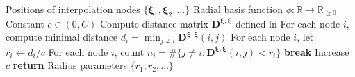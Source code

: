 \begin{algorithmic}[1]
    \Require Positions of interpolation nodes $\{\boldsymbol{\xi}_1, \boldsymbol{\xi}_2, \dots\}$
    \Require Radial basis function $\phi: \mathbb{R} \to \mathbb{R}_{\geq 0}$
    \Require Constant $c \in (0, C)$
    \State Compute distance matrix $\mathbf{D}^{\boldsymbol{\xi}, \boldsymbol{\xi}}$ defined in 
    \State For each node $i$, compute minimal distance $d_i = \min_{j \neq i} \mathbf{D}^{\boldsymbol{\xi}, \boldsymbol{\xi}}(i, j)$
        \State For each node $i$, let $r_i \gets d_i / c$
        \State For each node $i$, count $n_i = \# \{j \neq i: \mathbf{D}^{\boldsymbol{\xi}, \boldsymbol{\xi}}(i, j) < r_i \}$
            \State \textbf{break}
        \EndIf
        \State Increase $c$
    \EndWhile
    \State \textbf{return} Radius parameters $\{r_1, r_2, \dots \}$
\end{algorithmic}